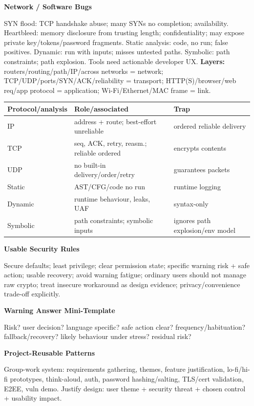 \documentclass[8pt]{extarticle}
\newcommand{\h}[1]{\vspace{1pt}\textbf{#1}\par}
\begin{document}
\begin{multicols*}{5}
\h{Network / Software Bugs}
SYN flood: TCP handshake abuse; many SYNs no completion; availability. Heartbleed: memory disclosure from trusting length; confidentiality; may expose private key/tokens/password fragments. Static analysis: code, no run; false positives. Dynamic: run with inputs; misses untested paths. Symbolic: path constraints; path explosion. Tools need actionable developer UX.
\textbf{Layers:} routers/routing/path/IP/across networks = network; TCP/UDP/ports/SYN/ACK/reliability = transport; HTTP(S)/browser/web req/app protocol = application; Wi-Fi/Ethernet/MAC frame = link.
\begin{tabularx}{\linewidth}{@{}lYY@{}}
\toprule
Protocol/analysis & Role/associated & Trap\\ \midrule
IP & address + route; best-effort unreliable & ordered reliable delivery\\
TCP & seq, ACK, retry, reasm.; reliable ordered & encrypts contents\\
UDP & no built-in delivery/order/retry & guarantees packets\\
Static & AST/CFG/code no run & runtime logging\\
Dynamic & runtime behaviour, leaks, UAF & syntax-only\\
Symbolic & path constraints; symbolic inputs & ignores path explosion/env model\\
\bottomrule
\end{tabularx}

\h{Usable Security Rules}
Secure defaults; least privilege; clear permission state; specific warning risk + safe action; usable recovery; avoid warning fatigue; ordinary users should not manage raw crypto; treat insecure workaround as design evidence; privacy/convenience trade-off explicitly.

\h{Warning Answer Mini-Template}
Risk? user decision? language specific? safe action clear? frequency/habituation? fallback/recovery? likely behaviour under stress? residual risk?

\h{Project-Reusable Patterns}
Group-work system: requirements gathering, themes, feature justification, lo-fi/hi-fi prototypes, think-aloud, auth, password hashing/salting, TLS/cert validation, E2EE, vuln demo. Justify design: user theme + security threat + chosen control + usability impact.


\end{multicols*}
\end{document}

